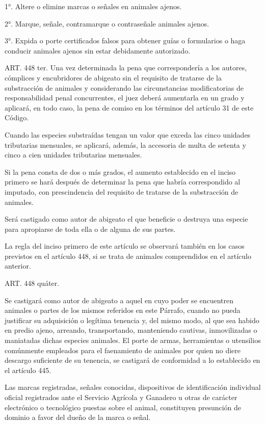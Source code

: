     1°. Altere o elimine marcas o señales en animales ajenos.

    2°. Marque, señale, contramarque o contraseñale animales ajenos.

    3°. Expida o porte certificados falsos para obtener guías o formularios o haga conducir animales ajenos sin estar debidamente autorizado.


    ART. 448 ter.
    Una vez determinada la pena que correspondería a los autores, cómplices y encubridores de abigeato sin el requisito de tratarse de la substracción de animales y considerando las circunstancias modificatorias de responsabilidad penal concurrentes, el juez deberá aumentarla en un grado y aplicará, en todo caso, la pena de comiso en los términos del artículo 31 de este Código.

    Cuando las especies substraídas tengan un valor que exceda las cinco unidades tributarias mensuales, se aplicará, además, la accesoria de multa de setenta y cinco a cien unidades tributarias mensuales.

    Si la pena consta de dos o más grados, el aumento establecido en el inciso primero se hará después de determinar la pena que habría correspondido al imputado, con prescindencia del requisito de tratarse de la substracción de animales.

    Será castigado como autor de abigeato el que beneficie o destruya una especie para apropiarse de toda ella o de alguna de sus partes.

    La regla del inciso primero de este artículo se observará también en los casos previstos en el artículo 448, si se trata de animales comprendidos en el artículo anterior.

    ART. 448 quáter.

    Se castigará como autor de abigeato a aquel en cuyo poder se encuentren animales o partes de los mismos referidos en este Párrafo, cuando no pueda justificar su adquisición o legítima tenencia y, del mismo modo, al que sea habido en predio ajeno, arreando, transportando, manteniendo cautivas, inmovilizadas o maniatadas dichas especies animales. El porte de armas, herramientas o utensilios comúnmente empleados para el faenamiento de animales por quien no diere descargo suficiente de su tenencia, se castigará de conformidad a lo establecido en el artículo 445.

    Las marcas registradas, señales conocidas, dispositivos de identificación individual oficial registrados ante el Servicio Agrícola y Ganadero u otras de carácter electrónico o tecnológico puestas sobre el animal, constituyen presunción de dominio a favor del dueño de la marca o señal.

